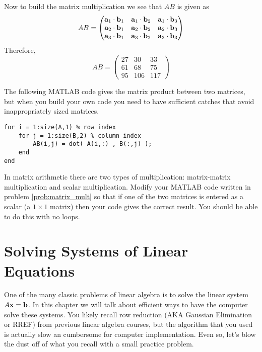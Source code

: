 \begin{example}
    Now to build the matrix multiplication we see that $AB$ is given as
    \[ AB = \begin{pmatrix} 
            {\bf a}_1 \cdot {\bf b}_1 & {\bf a}_1 \cdot {\bf b}_2 & {\bf a}_1 \cdot {\bf b}_3 \\
            {\bf a}_2 \cdot {\bf b}_1 & {\bf a}_2 \cdot {\bf b}_2 & {\bf a}_2 \cdot {\bf b}_3 \\
            {\bf a}_3 \cdot {\bf b}_1 & {\bf a}_3 \cdot {\bf b}_2 & {\bf a}_3 \cdot {\bf b}_3
    \end{pmatrix} \]
    Therefore,
    \[ AB = \begin{pmatrix} 27 & 30 & 33 \\
            61 & 68 & 75 \\
        95 & 106 & 117 \end{pmatrix} \]
\end{example}

The following MATLAB code gives the matrix product between two matrices, but when you
build your own code you need to have sufficient catches that avoid inappropriately sized
matrices.
\begin{lstlisting}
for i = 1:size(A,1) % row index
    for j = 1:size(B,2) % column index
        AB(i,j) = dot( A(i,:) , B(:,j) );
    end
end
\end{lstlisting}

\begin{problem}
    In matrix arithmetic there are two types of multiplication: matrix-matrix
    multiplication and scalar multiplication.  Modify your MATLAB code written in problem
    \ref{prob:matrix_mult} so that if one of the two matrices is entered as a scalar (a $1
    \times 1$ matrix) then your  code gives the correct result. You
    should be able to do this with no loops.
\end{problem}


\newpage\section{Solving Systems of Linear Equations}
One of the many classic problems of linear algebra is to solve the linear system $A {\bf x} =
{\bf b}$. In this chapter we will talk about efficient ways to have the computer solve
these systems. You likely recall row reduction (AKA Gaussian Elimination or RREF) from previous linear algebra
courses, but the algorithm that you used is actually slow an cumbersome for computer
implementation.  Even so, let's blow the dust off of what you recall with a small practice
problem.

